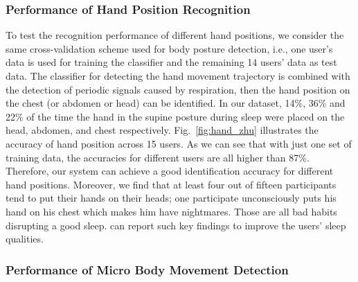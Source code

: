 \subsubsection{Performance of Hand Position Recognition}
To test the recognition performance of different hand positions, we consider the same cross-validation scheme used for body posture detection, i.e., one user's data is used for training the classifier and the remaining 14 users' data as test data. The classifier for detecting the hand movement trajectory is combined with the detection of periodic signals caused by respiration, then the hand position on the chest (or abdomen or head) can be identified. In our dataset, 14\%, 36\% and 22\% of the time the hand in the supine posture during sleep were placed on the head, abdomen, and chest respectively. Fig.~\ref{fig:hand_zhu} illustrates the accuracy of hand position across 15 users. As we can see that with just one set of training data, the accuracies for different users are all higher than 87\%. Therefore, our system can achieve a good identification accuracy for different hand positions. Moreover, we find that at least four out of fifteen participants tend to put their hands on their heads; one participate unconsciously puts his hand on his chest which makes him have nightmares. Those are all bad habits disrupting a good sleep. {\systemname} can report such key findings to improve the users' sleep qualities.


\subsubsection{Performance of Micro Body Movement Detection}

